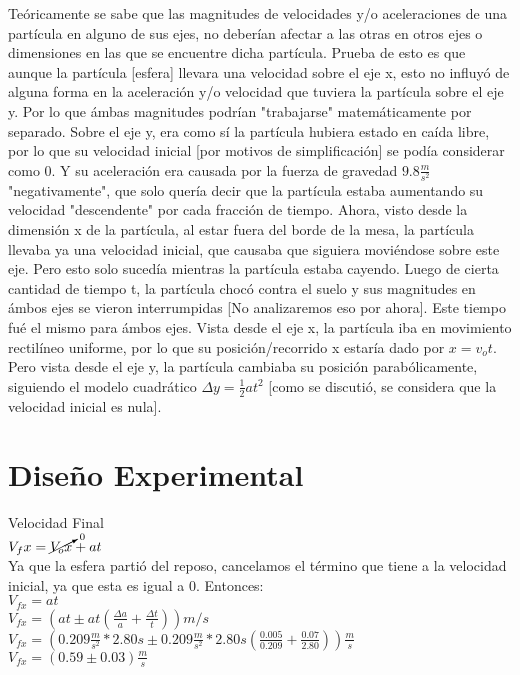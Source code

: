 \documentclass[osajnl,twocolumn,showpacs,superscriptaddress,10pt]{revtex4-1}
\begin{document}
Teóricamente se sabe que las magnitudes de velocidades y/o aceleraciones de una partícula en alguno de sus ejes, no deberían afectar a las otras en otros ejes o dimensiones en las que se encuentre dicha partícula. Prueba de esto es que aunque la partícula [esfera] llevara una velocidad sobre el eje x, esto no influyó de alguna forma en la aceleración y/o velocidad que tuviera la partícula sobre el eje y. Por lo que ámbas magnitudes podrían "trabajarse" matemáticamente por separado. Sobre el eje y, era como sí la partícula hubiera estado en caída libre, por lo que su velocidad inicial [por motivos de simplificación] se podía considerar como 0. Y su aceleración era causada por la fuerza de gravedad $ 9.8 \frac{m}{s^2}$ "negativamente", que solo quería decir que la partícula estaba aumentando su velocidad "descendente" por cada fracción de tiempo. Ahora, visto desde la dimensión x de la partícula, al estar fuera del borde de la mesa, la partícula llevaba ya una velocidad inicial, que causaba que siguiera moviéndose sobre este eje. Pero esto solo sucedía mientras la partícula estaba cayendo. Luego de cierta cantidad de tiempo t, la partícula chocó contra el suelo y sus magnitudes en ámbos ejes se vieron interrumpidas [No analizaremos eso por ahora]. Este tiempo fué el mismo para ámbos ejes. Vista desde el eje x, la partícula iba en movimiento rectilíneo uniforme, por lo que su posición/recorrido x estaría dado por $ x = v_ot$. Pero vista desde el eje y, la partícula cambiaba su posición parabólicamente, siguiendo el modelo cuadrático $ \Delta y = \frac{1}{2}at^2$ [como se discutió, se considera que la velocidad inicial es nula].

\section{Diseño Experimental}
Velocidad Final\\
$V_fx = \cancelto{0}{V_ox} + at $\\
Ya que la esfera partió del reposo, cancelamos el término que tiene a la velocidad inicial, ya que esta es igual a 0.
Entonces:\\
$V_{fx} = at $\\
$ V_{fx} = (at \pm at(\frac{\Delta a}{a} + \frac{\Delta t}{t})) m/s$\\
$V_{fx} = (0.209\frac{m}{s^2}*2.80s \pm 0.209\frac{m}{s^2}*2.80s(\frac{0.005}{0.209} + \frac{0.07}{2.80})) \frac{m}{s}$\\
$V_{fx} = (0.59 \pm 0.03) \frac{m}{s} $\\
\end{document}
